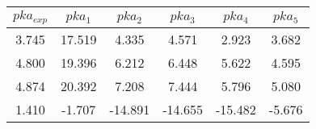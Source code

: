 \begin{tabular}{|c|c|c|c|c|c|}
    \hline
    $pka_{exp}$ & $pka_1$ & $pka_2$  & $pka_3$  & $pka_4$  & $pka_5$\\ \hline
    3.745      & 17.519  & 4.335    & 4.571    & 2.923    & 3.682  \\ \hline
    4.800       & 19.396  & 6.212    & 6.448    & 5.622    & 4.595  \\ \hline
    4.874         & 20.392  & 7.208    & 7.444    & 5.796    & 5.080  \\ \hline
    1.410    & -1.707  & -14.891  & -14.655  & -15.482  & -5.676  \\ \hline
\end{tabular}